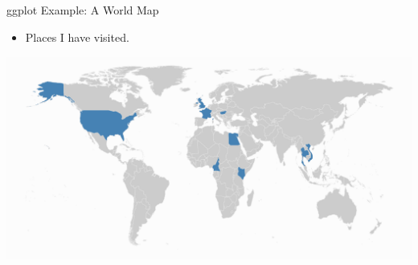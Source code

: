 \documentclass[10pt,ignorenonframetext,]{beamer}
\providecommand{\tightlist}{%
  \setlength{\itemsep}{0pt}\setlength{\parskip}{0pt}}
\begin{document}
\begin{frame}{ggplot Example: A World Map}

\begin{itemize}
\tightlist
\item
  Places I have visited.
\end{itemize}

\begin{center}\includegraphics[width=1\linewidth]{SpatialDataLecture_files/figure-beamer/unnamed-chunk-40-1} \end{center}

\end{frame}
\end{document}
